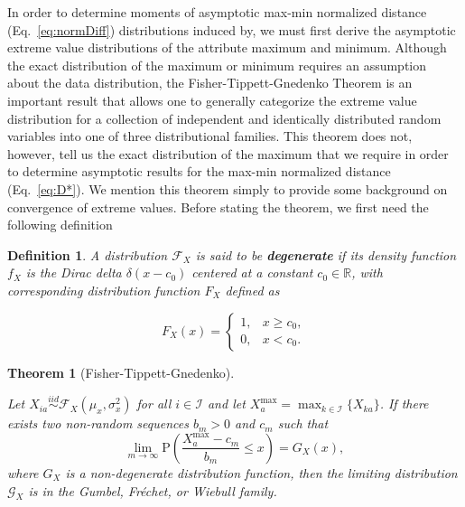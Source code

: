 \documentclass[aoas]{imsart}
\newtheorem{theorem}{Theorem}[section]
\newtheorem{definition}{Definition}[section]
\begin{document}
In order to determine moments of asymptotic max-min normalized distance (Eq.~\ref{eq:normDiff}) distributions induced by, we must first derive the asymptotic extreme value distributions of the attribute maximum and minimum. Although the exact distribution of the maximum or minimum requires an assumption about the data distribution, the Fisher-Tippett-Gnedenko Theorem is an important result that allows one to generally categorize the extreme value distribution for a collection of independent and identically distributed random variables into one of three distributional families. This theorem does not, however, tell us the exact distribution of the maximum that we require in order to determine asymptotic results for the max-min normalized distance (Eq.~\ref{eq:D*}). We mention this theorem simply to provide some background on convergence of extreme values. Before stating the theorem, we first need the following definition
%
\begin{definition}
	A distribution $\mathcal{F}_X$ is said to be \textbf{degenerate} if its density function $f_X$ is the Dirac delta $\delta(x - c_0)$ centered at a constant $c_0 \in \mathbb{R}$, with corresponding distribution function $F_X$ defined as
	
	\[F_X(x)=\begin{cases}
	1, & x \geq c_0, \\
	0, & x < c_0.
	\end{cases}
	\]
\end{definition}
%
\begin{theorem}[Fisher-Tippett-Gnedenko]\label{thm:EVT}
	
	Let $X_{ia} \overset{iid}{\sim} \mathcal{F}_X\left(\mu_x,\sigma^2_x\right)$ for all $i \in \mathcal{I}$ and let $X^\text{max}_a = \displaystyle \max_{k \in \mathcal{I}}\{X_{ka}\}$. If there exists two non-random sequences $b_m>0$ and $c_m$ such that
	\[\lim_{m \to \infty} \text{P}\left(\frac{X^\text{max}_a - c_m}{b_m} \leq x\right) = G_X(x),\]
	\noindent where $G_X$ is a non-degenerate distribution function, then the limiting distribution $\mathcal{G}_X$ is in the Gumbel, Fr\'{e}chet, or Wiebull family.
\end{theorem}
\end{document}
